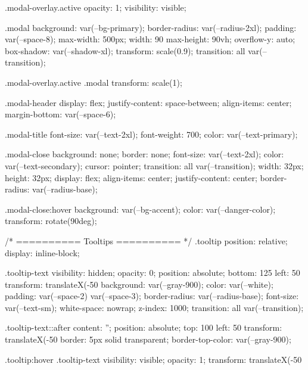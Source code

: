 .modal-overlay.active {
  opacity: 1;
  visibility: visible;
}

.modal {
  background: var(--bg-primary);
  border-radius: var(--radius-2xl);
  padding: var(--space-8);
  max-width: 500px;
  width: 90%
  max-height: 90vh;
  overflow-y: auto;
  box-shadow: var(--shadow-xl);
  transform: scale(0.9);
  transition: all var(--transition);
}

.modal-overlay.active .modal {
  transform: scale(1);
}

.modal-header {
  display: flex;
  justify-content: space-between;
  align-items: center;
  margin-bottom: var(--space-6);
}

.modal-title {
  font-size: var(--text-2xl);
  font-weight: 700;
  color: var(--text-primary);
}

.modal-close {
  background: none;
  border: none;
  font-size: var(--text-2xl);
  color: var(--text-secondary);
  cursor: pointer;
  transition: all var(--transition);
  width: 32px;
  height: 32px;
  display: flex;
  align-items: center;
  justify-content: center;
  border-radius: var(--radius-base);
}

.modal-close:hover {
  background: var(--bg-accent);
  color: var(--danger-color);
  transform: rotate(90deg);
}

/* ========== Tooltips ========== */
.tooltip {
  position: relative;
  display: inline-block;
}

.tooltip-text {
  visibility: hidden;
  opacity: 0;
  position: absolute;
  bottom: 125%
  left: 50%
  transform: translateX(-50%
  background: var(--gray-900);
  color: var(--white);
  padding: var(--space-2) var(--space-3);
  border-radius: var(--radius-base);
  font-size: var(--text-sm);
  white-space: nowrap;
  z-index: 1000;
  transition: all var(--transition);
}

.tooltip-text::after {
  content: '';
  position: absolute;
  top: 100%
  left: 50%
  transform: translateX(-50%
  border: 5px solid transparent;
  border-top-color: var(--gray-900);
}

.tooltip:hover .tooltip-text {
  visibility: visible;
  opacity: 1;
  transform: translateX(-50%
}

